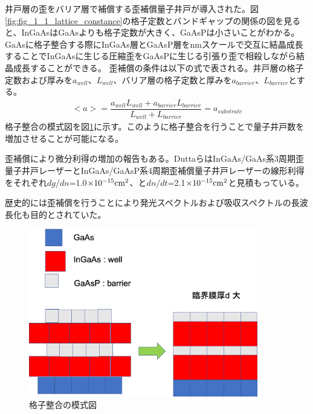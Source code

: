 井戸層の歪をバリア層で補償する歪補償量子井戸が導入された。図\ref{fig:fig_1_1_lattice_constance}の格子定数とバンドギャップの関係の図を見ると、InGaAsはGaAsよりも格子定数が大きく、GaAsPは小さいことがわかる。GaAsに格子整合する際に\rm{InGaAs}層とGaAsP層をnmスケールで交互に結晶成長することで\rm{InGaAs}に生じる圧縮歪をGaAsPに生じる引張り歪で相殺しながら結晶成長することができる。
歪補償の条件は以下の式で表される。井戸層の格子定数および厚みを$a_{well}$、$L_{well}$、バリア層の格子定数と厚みを$a_{barrier}$、$L_{barrier}$とする。
\begin{eqnarray}
<a>=\dfrac{a_{well}L_{well}+a_{barrier}L_{barrier}}{L_{well}+L_{barrier}}=a_{substrate}
\label{eq:conpensate}
\end{eqnarray}
格子整合の模式図を図\ref{fig:fig_1_1_lattice_strain_comp}に示す。このように格子整合を行うことで量子井戸数を増加させることが可能になる。


歪補償により微分利得の増加の報告もある\cite{ref_Dutta}。DuttaらはInGaAs/GaAs系3周期歪量子井戸レーザーとInGaAs/GaAsP系4周期歪補償量子井戸レーザーの線形利得をそれぞれ$dg/dn$=1.0$\times 10^{-15}\rm{cm^{2}}$、と$dn/dt$=2.1$\times 10^{-15}\rm{cm^{2}}$と見積もっている。

歴史的には歪補償を行うことにより発光スペクトルおよび吸収スペクトルの長波長化も目的とされていた。



\begin{figure}[h]
	\centering
	\includegraphics[width=10cm]{figure/fig_1_1_lattice_strain.png}
	\caption{格子整合の模式図}
	\label{fig:fig_1_1_lattice_strain_comp}
\end{figure}

